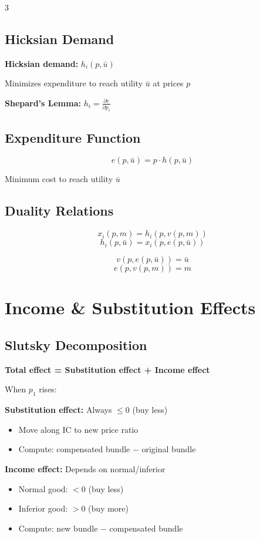 \documentclass[10pt,landscape]{article}
\newcommand{\formula}[2]{\textbf{#1:} $#2$}
\begin{document}
\begin{multicols}{3}
\subsection{Hicksian Demand}
\formula{Hicksian demand}{h_i(p, \bar{u})}

Minimizes expenditure to reach utility $\bar{u}$ at prices $p$

\textbf{Shepard's Lemma:} $h_i = \frac{\partial e}{\partial p_i}$

\subsection{Expenditure Function}
$$e(p, \bar{u}) = p \cdot h(p, \bar{u})$$

Minimum cost to reach utility $\bar{u}$

\subsection{Duality Relations}
$$x_i(p, m) = h_i(p, v(p, m))$$
$$h_i(p, \bar{u}) = x_i(p, e(p, \bar{u}))$$

$$v(p, e(p, \bar{u})) = \bar{u}$$
$$e(p, v(p, m)) = m$$

\section{Income \& Substitution Effects}

\subsection{Slutsky Decomposition}
\textbf{Total effect = Substitution effect + Income effect}

When $p_1$ rises:

\textbf{Substitution effect:} Always $\leq 0$ (buy less)
\begin{itemize}[leftmargin=*,noitemsep]
\item Move along IC to new price ratio
\item Compute: compensated bundle − original bundle
\end{itemize}

\textbf{Income effect:} Depends on normal/inferior
\begin{itemize}[leftmargin=*,noitemsep]
\item Normal good: $< 0$ (buy less)
\item Inferior good: $> 0$ (buy more)
\item Compute: new bundle − compensated bundle
\end{itemize}


\end{multicols}
\end{document}
